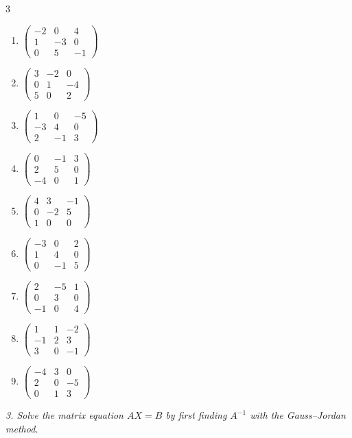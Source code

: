\begin{multicols}{3}
\begin{enumerate}[label=\arabic*.,  leftmargin=*]
\item $\begin{pmatrix}-2&0&4\\1&-3&0\\0&5&-1\end{pmatrix}$
\item $\begin{pmatrix}3&-2&0\\0&1&-4\\5&0&2\end{pmatrix}$
\item $\begin{pmatrix}1&0&-5\\-3&4&0\\2&-1&3\end{pmatrix}$
\item $\begin{pmatrix}0&-1&3\\2&5&0\\-4&0&1\end{pmatrix}$
\item $\begin{pmatrix}4&3&-1\\0&-2&5\\1&0&0\end{pmatrix}$
\item $\begin{pmatrix}-3&0&2\\1&4&0\\0&-1&5\end{pmatrix}$
\item $\begin{pmatrix}2&-5&1\\0&3&0\\-1&0&4\end{pmatrix}$
\item $\begin{pmatrix}1&1&-2\\-1&2&3\\3&0&-1\end{pmatrix}$
\item $\begin{pmatrix}-4&3&0\\2&0&-5\\0&1&3\end{pmatrix}$
\end{enumerate}
\end{multicols}
\emph{3. Solve the matrix equation $AX=B$ by first finding $A^{-1}$ with the
Gauss–Jordan method.}
\bigskip
